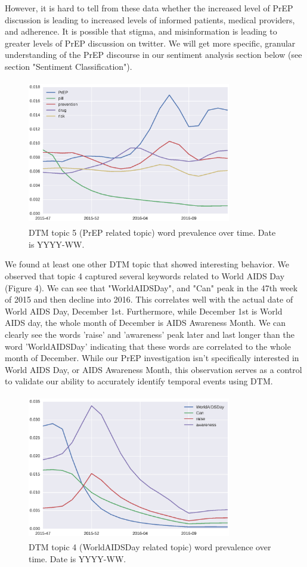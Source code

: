\documentclass{sig-alternate-05-2015}
\begin{document}
However, it is hard to tell from these data whether the increased level of PrEP discussion is leading to increased levels of informed patients, medical providers, and adherence. It is possible that stigma, and misinformation is leading to greater levels of PrEP discussion on twitter. We will get more specific, granular understanding of the PrEP discourse in our sentiment analysis section below (see section "Sentiment Classification").

\begin{figure}
\centering
\includegraphics[height=2.5in, width=3.5in]{DTMfig1}
\caption{DTM topic 5 (PrEP related topic) word prevalence over time. Date is YYYY-WW.}
\end{figure}

We found at least one other DTM topic that showed interesting behavior. We observed that topic 4 captured several keywords related to World AIDS Day (Figure 4). We can see that "WorldAIDSDay", and "Can" peak in the 47th week of 2015 and then decline into 2016. This correlates well with the actual date of World AIDS Day, December 1st. Furthermore, while December 1st is World AIDS day, the whole month of December is AIDS Awareness Month. We can clearly see the words 'raise' and 'awareness' peak later and last longer than the word 'WorldAIDSDay' indicating that these words are correlated to the whole month of December. While our PrEP investigation isn't specifically interested in World AIDS Day, or AIDS Awareness Month, this observation serves as a control to validate our ability to accurately identify temporal events using DTM. 

\begin{figure}
\centering
\includegraphics[height=2.5in, width=3.5in]{DTMfig2}
\caption{DTM topic 4 (WorldAIDSDay related topic) word prevalence over time. Date is YYYY-WW.}
\end{figure}
\end{document}
